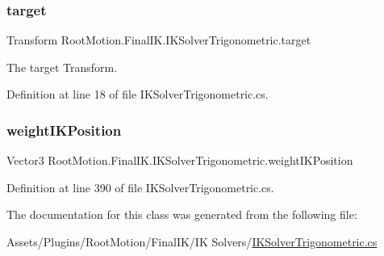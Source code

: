 \subsubsection{\texorpdfstring{target}{target}}
{\footnotesize\ttfamily Transform Root\+Motion.\+Final\+I\+K.\+I\+K\+Solver\+Trigonometric.\+target}



The target Transform. 



Definition at line 18 of file I\+K\+Solver\+Trigonometric.\+cs.

\mbox{\label{class_root_motion_1_1_final_i_k_1_1_i_k_solver_trigonometric_adab128ae2e20a68d5b4f948c486f4ccf}} 
\subsubsection{\texorpdfstring{weight\+I\+K\+Position}{weightIKPosition}}
{\footnotesize\ttfamily Vector3 Root\+Motion.\+Final\+I\+K.\+I\+K\+Solver\+Trigonometric.\+weight\+I\+K\+Position\hspace{0.3cm}{\ttfamily [protected]}}



Definition at line 390 of file I\+K\+Solver\+Trigonometric.\+cs.



The documentation for this class was generated from the following file\+:\begin{DoxyCompactItemize}
\item 
Assets/\+Plugins/\+Root\+Motion/\+Final\+I\+K/\+I\+K Solvers/\mbox{\hyperlink{_i_k_solver_trigonometric_8cs}{I\+K\+Solver\+Trigonometric.\+cs}}\end{DoxyCompactItemize}
